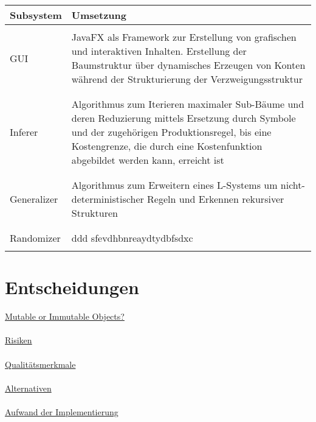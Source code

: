 \begin{center}
    \begin{tabular}{l|l}
        \textbf{Subsystem} & \textbf{Umsetzung} \\
        \hline \\
        GUI &
        \begin{minipage}[t]{0.8\textwidth}
            JavaFX als Framework zur Erstellung von grafischen und interaktiven Inhalten.
            Erstellung der Baumstruktur über dynamisches Erzeugen von Konten während der Strukturierung der
            Verzweigungsstruktur
        \end{minipage} \\
        \\ \hline \\
        Inferer &
        \begin{minipage}[t]{0.8\textwidth}
            Algorithmus zum Iterieren maximaler Sub-Bäume und deren Reduzierung mittels Ersetzung durch Symbole
            und der zugehörigen Produktionsregel, bis eine Kostengrenze, die durch eine Kostenfunktion abgebildet
            werden kann, erreicht ist
        \end{minipage} \\
        \\ \hline \\
        Generalizer &
        \begin{minipage}[t]{0.8\textwidth}
            Algorithmus zum Erweitern eines L-Systems um nicht-deterministischer Regeln und Erkennen rekursiver
            Strukturen
        \end{minipage} \\
        \\ \hline \\
        Randomizer &
        \begin{minipage}[t]{0.8\textwidth}
            ddd sfevdhbnreaydtydbfsdxc
        \end{minipage} \\
        \\ \hline
    \end{tabular}
\end{center}

\section{Entscheidungen}
\underline{Mutable or Immutable Objects?}\\~\\
\underline{Risiken}\\~\\
\underline{Qualitätsmerkmale}\\~\\
\underline{Alternativen}\\~\\
\underline{Aufwand der Implementierung}

